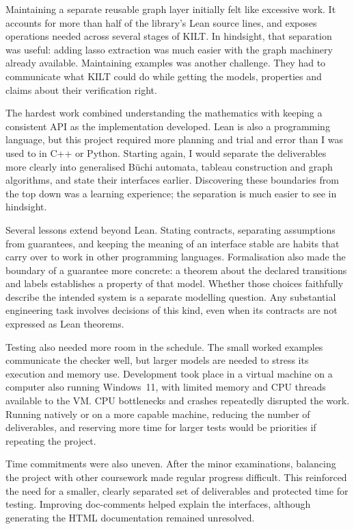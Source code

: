 Maintaining a separate reusable graph layer initially felt like excessive
work. It accounts for more than half of the library's Lean source lines,
and exposes operations needed across several stages of KILT. In hindsight,
that separation was useful: adding lasso extraction was much easier with
the graph machinery already available. Maintaining examples was another
challenge. They had to communicate what KILT could do while getting the
models, properties and claims about their verification right.

The hardest work combined understanding the mathematics with keeping a
consistent API as the implementation developed. Lean is also a programming
language, but this project required more planning and trial and error than
I was used to in C++ or Python. Starting again, I would separate the
deliverables more clearly into generalised B\"uchi automata, tableau
construction and graph algorithms, and state their interfaces earlier.
Discovering these boundaries from the top down was a learning experience;
the separation is much easier to see in hindsight.

Several lessons extend beyond Lean. Stating contracts, separating assumptions
from guarantees, and keeping the meaning of an interface stable are habits
that carry over to work in other programming languages. Formalisation also
made the boundary of a guarantee more concrete: a theorem about the declared
transitions and labels establishes a property of that model. Whether those
choices faithfully describe the intended system is a separate modelling
question. Any substantial engineering task involves decisions of this kind,
even when its contracts are not expressed as Lean theorems.

Testing also needed more room in the schedule. The small worked examples
communicate the checker well, but larger models are needed to stress its
execution and memory use. Development took place in a virtual machine on a
computer also running Windows~11, with limited memory and CPU threads
available to the VM. CPU bottlenecks and crashes repeatedly disrupted the
work. Running natively or on a more capable machine, reducing the number of
deliverables, and reserving more time for larger tests would be priorities
if repeating the project.

Time commitments were also uneven. After the minor examinations, balancing
the project with other coursework made regular progress difficult. This
reinforced the need for a smaller, clearly separated set of deliverables and
protected time for testing. Improving doc-comments helped explain the
interfaces, although generating the HTML documentation remained unresolved.

\clearpage

